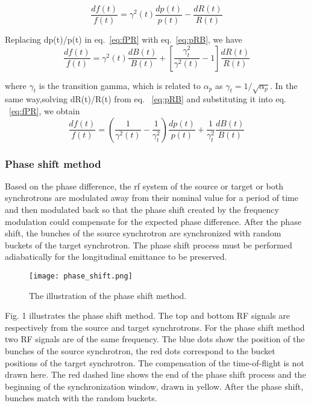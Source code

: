 \begin{equation}
\label{eq:fPR}
\frac{df(t)}{f(t)} ={\gamma^2(t)}\frac{dp(t)}{p(t)}-\frac{dR(t)}{R(t)} 
\end{equation}

Replacing dp(t)/p(t) in eq.~\ref{eq:fPR} with eq.~\ref{eq:pRB}, we have
\begin{equation}
\label{eq:fBR}
\frac{df(t)}{f(t)} ={\gamma^2(t)}\frac{dB(t)}{B(t)}+[\frac{\gamma_t^2}{\gamma^2(t)}-1]\frac{dR(t)}{R(t)} 
\end{equation}

where $\gamma_t$ is the transition gamma, which is related to $\alpha_p$ as $\gamma_t=1/\sqrt{\alpha_p}$. In the same way,solving dR(t)/R(t) from eq. ~\ref{eq:pRB} and substituting it into eq. ~\ref{eq:fPR}, we obtain
\begin{equation}
\label{eq:fPB}
\frac{df(t)}{f(t)} =(\frac{1}{\gamma^2(t)}-\frac{1}{\gamma_t^2}) \frac{dp(t)}{p(t)}+\frac{1}{\gamma_t^2}\frac{dB(t)}{B(t)} 
\end{equation}

\subsubsection{Phase shift method}

Based on the phase difference, the rf system of the source or target or both synchrotrons are modulated away from their nominal value for a period of time and then modulated back so that the phase shift created by the frequency modulation could compensate for the expected phase difference. After the phase shift, the bunches of the source synchrotron are synchronized with random buckets of the target synchrotron. The phase shift process must be performed adiabatically for the longitudinal emittance to be preserved.

\begin{figure}[!htb]
   \centering   
   \texttt{[image: phase\_shift.png]}
   \caption{The illustration of the phase shift method.}
   \label{phase_shift}
\end{figure}

Fig. 1 illustrates the phase shift method. The top and bottom RF signals are respectively from the source and target synchrotrons. For the phase shift method two RF signals are of the same frequency. The blue dots show the position of the bunches of the source synchrotron, the red dots correspond to the bucket positions of the target synchrotron. The compensation of the time-of-flight is not drawn here. The red dashed line shows the end of the phase shift process and the beginning of the synchronization window, drawn in yellow. After the phase shift, bunches match with the random buckets.  


